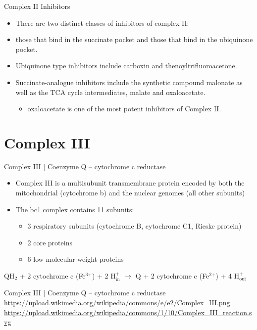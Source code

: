 \documentclass[presentation, smaller]{beamer}
\begin{document}
\begin{frame}[label={sec:org158c8ee}]{Complex II Inhibitors}
\begin{itemize}
\item There are two distinct classes of inhibitors of complex II:
\item those that bind in the succinate pocket and those that bind in the ubiquinone pocket.
\item Ubiquinone type inhibitors include carboxin and thenoyltrifluoroacetone.
\item Succinate-analogue inhibitors include the synthetic compound malonate as well as the TCA cycle intermediates, malate and oxaloacetate.
\begin{itemize}
\item oxaloacetate is one of the most potent inhibitors of Complex II.
\end{itemize}
\end{itemize}
\end{frame}

\section{Complex III}
\label{sec:org3a471d5}
\begin{frame}[label={sec:org7967281}]{Complex III | Coenzyme Q – cytochrome c reductase}
\begin{itemize}
\item Complex III is a multisubunit transmembrane protein encoded by both
the mitochondrial (cytochrome b) and the nuclear genomes (all other
subunits)

\item The bc1 complex contains 11 subunits:
\begin{itemize}
\item 3 respiratory subunits (cytochrome B, cytochrome C1, Rieske protein)
\item 2 core proteins
\item 6 low-molecular weight proteins
\end{itemize}
\end{itemize}

QH\(_{\text{2}}\) + 2 cytochrome c (Fe\(^{\text{3+}}\)) + 2 H\(^{\text{+}}_{\text{in}}\) \(\to\)  Q + 2 cytochrome c (Fe\(^{\text{2+}}\)) + 4 H\(^{\text{+}}_{\text{out}}\)
\end{frame}


\begin{frame}[label={sec:org7497ffe}]{Complex III | Coenzyme Q – cytochrome c reductase}
\url{https://upload.wikimedia.org/wikipedia/commons/e/e2/Complex\_III.png}
\url{https://upload.wikimedia.org/wikipedia/commons/1/10/Complex\_III\_reaction.svg}
\end{frame}
\end{document}
